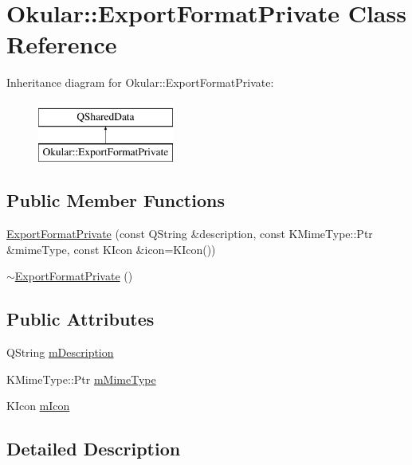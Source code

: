 \hypertarget{classOkular_1_1ExportFormatPrivate}{\section{Okular\+:\+:Export\+Format\+Private Class Reference}
\label{classOkular_1_1ExportFormatPrivate}
}
Inheritance diagram for Okular\+:\+:Export\+Format\+Private\+:\begin{figure}[H]
\begin{center}
\leavevmode
\includegraphics[height=2.000000cm]{classOkular_1_1ExportFormatPrivate}
\end{center}
\end{figure}
\subsection*{Public Member Functions}
\begin{DoxyCompactItemize}
\item 
\hyperlink{classOkular_1_1ExportFormatPrivate_a689f502392e50baae96b33e867ef0327}{Export\+Format\+Private} (const Q\+String \&description, const K\+Mime\+Type\+::\+Ptr \&mime\+Type, const K\+Icon \&icon=K\+Icon())
\item 
\hyperlink{classOkular_1_1ExportFormatPrivate_ae0d83dc79179160a6684ab5432729ee1}{$\sim$\+Export\+Format\+Private} ()
\end{DoxyCompactItemize}
\subsection*{Public Attributes}
\begin{DoxyCompactItemize}
\item 
Q\+String \hyperlink{classOkular_1_1ExportFormatPrivate_ab09623822827ddc8b18ec6732ce76e9d}{m\+Description}
\item 
K\+Mime\+Type\+::\+Ptr \hyperlink{classOkular_1_1ExportFormatPrivate_a93c0752151f98999936ef26dbb598ece}{m\+Mime\+Type}
\item 
K\+Icon \hyperlink{classOkular_1_1ExportFormatPrivate_ab1d476d68599e933cd2692dc18c57d17}{m\+Icon}
\end{DoxyCompactItemize}


\subsection{Detailed Description}


